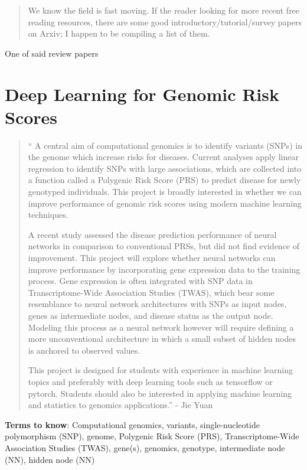 \begin{quote}
We know the field is fast moving. If the reader looking for more recent free reading resources, there are some good introductory/tutorial/survey papers on Arxiv; I happen to be compiling a list of them.
\end{quote}

 One of said review papers \cite{raghu2020survey}

\cite[hello]{raghu2020survey}

\section{Deep Learning for Genomic Risk Scores}

\begin{quotation}
``
A central aim of computational genomics is to identify variants (SNPs) in the genome which increase risks for diseases. Current analyses apply linear regression to identify SNPs with large associations, which are collected into a function called a Polygenic Risk Score (PRS) to predict disease for newly genotyped individuals. This project is broadly interested in whether we can improve performance of genomic risk scores using modern machine learning techniques.

A recent study assessed the disease prediction performance of neural networks in comparison to conventional PRSs, but did not find evidence of improvement. This project will explore whether neural networks can improve performance by incorporating gene expression data to the training process. Gene expression is often integrated with SNP data in Transcriptome-Wide Association Studies (TWAS), which bear some resemblance to neural network architectures with SNPs as input nodes, genes as intermediate nodes, and disease status as the output node. Modeling this process as a neural network however will require defining a more unconventional architecture in which a small subset of hidden nodes is anchored to observed values.

This project is designed for students with experience in machine learning topics and preferably with deep learning tools such as tensorflow or pytorch. Students should also be interested in applying machine learning and statistics to genomics applications.'' - Jie Yuan
\end{quotation}

\textbf{Terms to know}: Computational genomics, variants, single-nucleotide polymorphism (SNP), genome, Polygenic Risk Score (PRS), Transcriptome-Wide Association Studies (TWAS), gene(s), genomics, genotype, intermediate node (NN), hidden node (NN)

